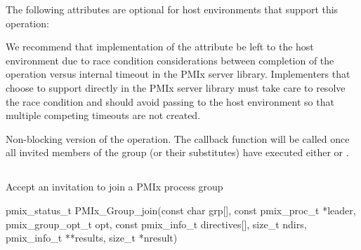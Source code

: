 \optattrstart
The following attributes are optional for host environments that support this operation:


\optattrend

\adviceimplstart
We recommend that implementation of the  attribute be left to the host environment due to race condition considerations between completion of the operation versus internal timeout in the \ac{PMIx} server library. Implementers that choose to support  directly in the \ac{PMIx} server library must take care to resolve the race condition and should avoid passing  to the host environment so that multiple competing timeouts are not created.
\adviceimplend

\descr

Non-blocking version of the  operation. The callback function will be called once all invited members of the group (or their substitutes) have executed either  or .

\subsection{}

\summary

Accept an invitation to join a \ac{PMIx} process group

\format

\cspecificstart
\begin{codepar}
pmix_status_t
PMIx_Group_join(const char grp[],
                const pmix_proc_t *leader,
                pmix_group_opt_t opt,
                const pmix_info_t directives[], size_t ndirs,
                pmix_info_t **results, size_t *nresult)
\end{codepar}
\cspecificend

\begin{arglist}
\end{arglist}


